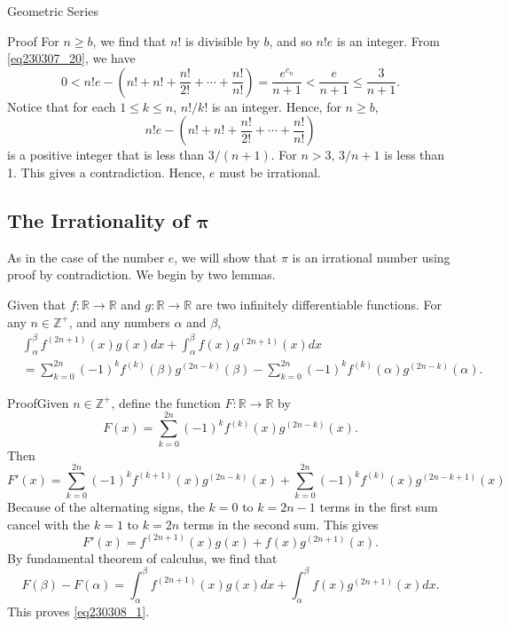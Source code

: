 \begin{example}[label=230305_16]{Geometric Series}
\begin{example}[label=230304_9]{}
\begin{example}{}
\begin{example}{}
\begin{myproof}{Proof}
For $n\geq b$, we find that
$n!$ is divisible by $b$, and so $n!e$ is an integer. From \eqref{eq230307_20}, we have
\[0<n!e-\left(n!+n!+\frac{n!}{2!}+\cdots+\frac{n!}{n!}\right)=\frac{e^{c_n}}{n+1}<\frac{e}{n+1}\leq  \frac{3}{n+1}.\]
Notice that for each $1\leq k\leq n$, $n!/k!$ is an integer. Hence, for $n\geq b$, 
\[n!e-\left(n!+n!+\frac{n!}{2!}+\cdots+\frac{n!}{n!}\right)\] is a positive integer that is less than $3/(n+1)$. For $n>3$, $3/n+1$ is less than 1. This gives a contradiction. Hence, $e$ must be irrational.
\end{myproof}

\bigskip
\subsection[The Irrationality of $\pi$]{The Irrationality of $\pmb{\pi}$}\label{sec6.6.2}

As in the case of the number $e$, we will show that $\pi$ is an irrational number using proof by contradiction. 
We begin by two lemmas.
\begin{lemma}[label=230309_1]{}
Given that $f:\mathbb{R}\to\mathbb{R}$ and $g:\mathbb{R}\to\mathbb{R}$ are two infinitely differentiable functions. For any $n\in\mathbb{Z}^+$, and any numbers $\alpha$ and $\beta$,
\begin{equation}\label{eq230308_1}\begin{split}
&\int_{\alpha}^{\beta} f^{(2n+1)}(x)g(x)dx+\int_{\alpha}^{\beta} f(x)g^{(2n+1)}(x)dx\\ &=\sum_{k=0}^{2n}(-1)^k f^{(k)}(\beta)g^{(2n-k)}(\beta)-\sum_{k=0}^{2n}(-1)^k f^{(k)}(\alpha)g^{(2n-k)}(\alpha).
\end{split}\end{equation}

\end{lemma}
\begin{myproof}{Proof}Given  $n\in\mathbb{Z}^+$,
define the function $F:\mathbb{R}\to\mathbb{R}$ by
\[F (x)=\sum_{k=0}^{2n}(-1)^k f^{(k)}(x)g^{(2n-k)}(x).\]
Then
\[
F'(x) =\sum_{k=0}^{2n}(-1)^kf^{(k+1)}(x)g^{(2n-k)}(x)+\sum_{k=0}^{2n}(-1)^kf^{(k)}(x)g^{(2n-k+1)}(x)\]Because of the alternating signs, the $k=0$ to $k=2n-1$ terms in the first sum cancel with the $k=1$ to $k=2n$ terms in the second sum.  This gives
\[
F'(x)=f^{(2n+1)}(x)g(x)+f(x)g^{(2n+1)}(x).
\]  By fundamental theorem of calculus, we find that  
\[
F(\beta)-F(\alpha)=\int_{\alpha}^{\beta} f^{(2n+1)}(x)g(x)dx+\int_{\alpha}^{\beta} f(x)g^{(2n+1)}(x)dx.
\]This proves \eqref{eq230308_1}.
\end{myproof}


\end{example}
\end{example}
\end{example}
\end{example}

